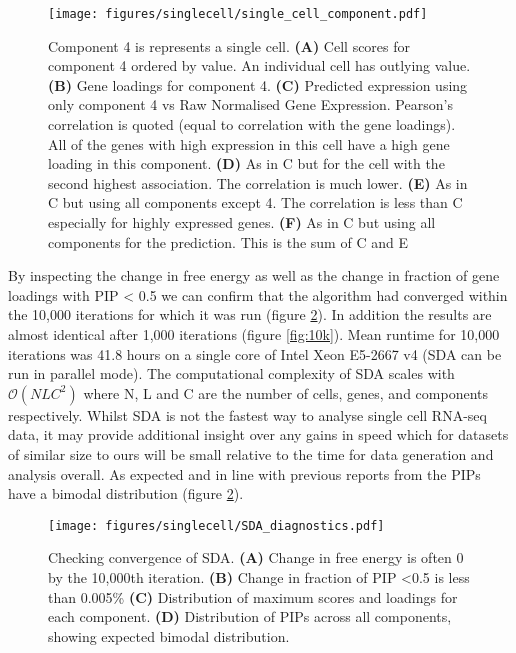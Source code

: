 \begin{figure}[H]
	\centering
	\texttt{[image: figures/singlecell/single\_cell\_component.pdf]}
	\caption[A Single Cell Component]{Component 4 is represents a single cell.
		\textbf{(A)} Cell scores for component 4 ordered by value. An individual cell has outlying value.
		\textbf{(B)} Gene loadings for component 4.
		\textbf{(C)} Predicted expression using only component 4 vs Raw Normalised Gene Expression. Pearson's correlation is quoted (equal to correlation with the gene loadings). All of the genes with high expression in this cell have a high gene loading in this component.
		\textbf{(D)} As in C but for the cell with the second highest association. The correlation is much lower. 
		\textbf{(E)} As in C but using all components except 4. The correlation is less than C especially for highly expressed genes.
		\textbf{(F)} As in C but using all components for the prediction. This is the sum of C and E
	}
	\label{fig:single_cell_component}
\end{figure}

By inspecting the change in free energy as well as the change in fraction of gene loadings with PIP < 0.5 we can confirm that the algorithm had converged within the 10,000 iterations for which it was run (figure \ref{fig:SDA_diagnostics}). In addition the results are almost identical after 1,000 iterations (figure \ref{fig:10k}). Mean runtime for 10,000 iterations was 41.8 hours on a single core of Intel Xeon E5-2667 v4 (SDA can be run in parallel mode). The computational complexity of SDA scales with $\mathcal{O}(NLC^2)$ where N, L and C are the number of cells, genes, and components respectively. Whilst SDA is not the fastest way to analyse single cell RNA-seq data, it may provide additional insight over any gains in speed which for datasets of similar size to ours will be small relative to the time for data generation and analysis overall. As expected and in line with previous reports from \cite{Hore2016Tensor} the PIPs have a bimodal distribution (figure \ref{fig:SDA_diagnostics}).

\begin{figure}[H]
	\centering
	\texttt{[image: figures/singlecell/SDA\_diagnostics.pdf]}
	\caption[SDA Convergence]{Checking convergence of SDA.
		\textbf{(A)} Change in free energy is often 0 by the 10,000th iteration.
		\textbf{(B)} Change in fraction of PIP <0.5 is less than 0.005\%
		\textbf{(C)} Distribution of maximum scores and loadings for each component.
		\textbf{(D)} Distribution of PIPs across all components, showing expected bimodal distribution.}
	\label{fig:SDA_diagnostics}
\end{figure}

